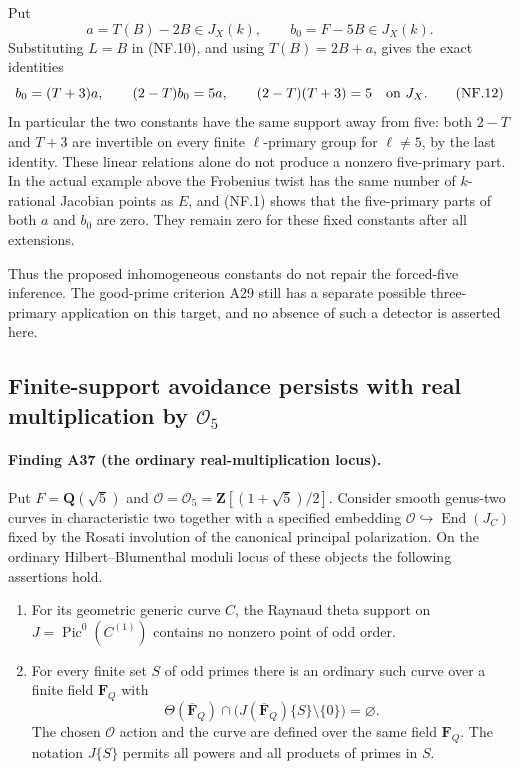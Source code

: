 \documentclass[11pt,a4paper]{article}
\begin{document}
Put
\[
             a=T(B)-2B\in J_X(k),
             \qquad b_0=F-5B\in J_X(k).
 \tag{NF.11}
\]
Substituting $L=B$ in (NF.10), and using $T(B)=2B+a$,
gives the exact identities
\[
       b_0=(T+3)a,
       \qquad (2-T)b_0=5a,
       \qquad (2-T)(T+3)=5\quad\hbox{on }J_X.
 \tag{NF.12}
\]
In particular the two constants have the same support away from
five: both $2-T$ and $T+3$ are invertible on every finite
$\ell$-primary group for $\ell\ne5$, by the last identity.
These linear relations alone do not produce a nonzero five-primary
part. In the actual example above the Frobenius twist has the same
number of $k$-rational Jacobian points as $E$, and (NF.1) shows
that the five-primary parts of both $a$ and $b_0$ are zero.
They remain zero for these fixed constants after all extensions.

Thus the proposed inhomogeneous constants do not repair the
forced-five inference. The good-prime criterion A29 still has a
separate possible three-primary application on this target, and
no absence of such a detector is asserted here.


\subsection{Finite-support avoidance persists with real multiplication by
\texorpdfstring{$\mathcal O_5$}{O5}}
\label{sec:rm5-avoidance}

\paragraph{Finding A37 (the ordinary real-multiplication locus).}
Put $F=\mathbf Q(\sqrt5)$ and
$\mathcal O=\mathcal O_5=\mathbf Z[(1+\sqrt5)/2]$.
Consider smooth genus-two curves in characteristic two together with
a specified embedding $\mathcal O\hookrightarrow\operatorname{End}(J_C)$
fixed by the Rosati involution of the canonical principal polarization.
On the ordinary Hilbert--Blumenthal moduli locus of these objects the
following assertions hold.

\begin{enumerate}
\item For its geometric generic curve $C$, the Raynaud theta support on
$J=\operatorname{Pic}^0(C^{(1)})$ contains no nonzero point of odd order.
\item For every finite set $S$ of odd primes there is an ordinary such
curve over a finite field $\mathbf F_Q$ with
\[
 \Theta(\overline{\mathbf F}_Q)\cap
 \bigl(J(\overline{\mathbf F}_Q)\{S\}\setminus\{0\}\bigr)
                         =\varnothing.                       \tag{RM.1}
\]
The chosen $\mathcal O$ action and the curve are defined over the same
field $\mathbf F_Q$.  The notation $J\{S\}$ permits all powers and all
products of primes in $S$.
\end{enumerate}
\end{document}
